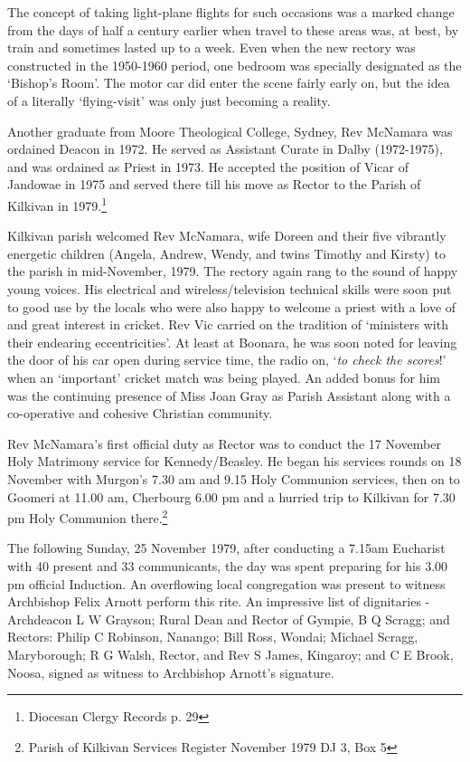The concept of taking light-plane flights for such occasions was a marked change from the days of half a century earlier when travel to these areas was, at best, by train and sometimes lasted up to a week. Even when the new rectory was constructed in the 1950-1960 period, one bedroom was specially designated as the `Bishop's Room'. The motor car did enter the scene fairly early on, but the idea of a literally `flying-visit' was only just becoming a reality.



Another graduate from Moore Theological College, Sydney, Rev McNamara was ordained Deacon in 1972. He served as Assistant Curate in Dalby (1972-1975), and was ordained as Priest in 1973. He accepted the position of Vicar of Jandowae in 1975 and served there till his move as Rector to the Parish of Kilkivan in 1979.\footnote{Diocesan Clergy Records p. 29}


Kilkivan parish welcomed Rev McNamara, wife Doreen and their five vibrantly energetic children (Angela, Andrew, Wendy, and twins Timothy and Kirsty) to the parish in mid-November, 1979. The rectory again rang to the sound of happy young voices. His electrical and wireless/television technical skills were soon put to good use by the locals who were also happy to welcome a priest with a love of and great interest in cricket. Rev Vic carried on the tradition of `ministers with their endearing eccentricities'. At least at Boonara, he was soon noted for leaving the door of his car open during service time, the radio on, `\emph{to check the scores}!' when an `important' cricket match was being played. An added bonus for him was the continuing presence of Miss Joan Gray as Parish Assistant along with a co-operative and cohesive Christian community.



Rev McNamara's first official duty as Rector was to conduct the 17 November Holy Matrimony service for Kennedy/Beasley. He began his services rounds on 18 November with Murgon's 7.30 am and 9.15 Holy Communion services, then on to Goomeri at 11.00 am, Cherbourg 6.00 pm and a hurried trip to Kilkivan for 7.30 pm Holy Communion there.\footnote{Parish of Kilkivan Services Register November 1979 DJ 3, Box 5}


The following Sunday, 25 November 1979, after conducting a 7.15am Eucharist with 40 present and 33 communicants, the day was spent preparing for his 3.00 pm official Induction. An overflowing local congregation was present to witness Archbishop Felix Arnott perform this rite. An impressive list of dignitaries - Archdeacon L W Grayson; Rural Dean and Rector of Gympie, B Q Scragg; and Rectors: Philip C Robinson, Nanango; Bill Ross, Wondai; Michael Scragg, Maryborough; R G Walsh, Rector, and Rev S James, Kingaroy; and C E Brook, Noosa, signed as witness to Archbishop Arnott's signature.



